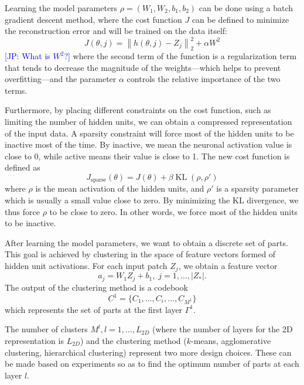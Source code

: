 \documentclass[runningheads]{llncs}
\newcommand{\commentJP}[1]{\textcolor{blue}{[JP: #1]}}
\newcommand{\KL}{\mathop{\textrm{KL}}}
\begin{document}
Learning the model parameters $\rho=(W_1,W_2,b_1,b_2)$ can be done using a batch gradient descent method, where the cost function $J$ can be defined to minimize the reconstruction error and will be trained on the data itself:
\begin{equation}
   J(\theta,j)=\left\|h(\theta,j)-Z_j\right\|_2^2 + \alpha W^2
\end{equation}
\commentJP{What is $W^2$?}
where the second term of the function is a regularization term that tends to decrease the magnitude of the weights---which helps to prevent overfitting---and the parameter $\alpha$ controls the relative importance of the two terms.
 
Furthermore, by placing different constraints on the cost function, such as limiting the number of hidden units, we can obtain a compressed representation of the input data. A sparsity constraint will force most of the hidden units to be inactive most of the time. By inactive, we mean the neuronal activation value is close to 0, while active means their value is close to 1. The new cost function is defined as
\begin{equation}
J_{\textrm{sparse}}(\theta)=J(\theta)+\beta \KL(\rho,\rho')
\end{equation}
where $\rho$ is the mean activation of the hidden units, and $\rho'$ is a sparsity parameter which is usually a small value close to zero. By minimizing the KL divergence, we thus force $\rho$ to be close to zero. In other words, we force most of the hidden units to be inactive.

After learning the model parameters, we want to obtain a discrete set of parts. This goal is achieved by clustering in the space of feature vectors formed of hidden unit activations. For each input patch $Z_j$, we obtain a feature vector
\begin{equation}
a_j=W_1Z_j+b_1, \;j=1,\ldots,|Z_*|.
\end{equation}
The output of the clustering method is a codebook
\begin{equation}
C^1=\{C_1,\ldots,C_i,\ldots,C_{M^1}\}
\end{equation}
which represents the set of parts at the first layer $\Gamma^{1}$. 

The number of clusters $M^l, l=1,\ldots,L_{2D}$ (where the number of layers for the 2D representation is $L_{2D}$) and the clustering method ($k$-means, agglomerative clustering, hierarchical clustering) represent two more design choices. These can be made based on experiments so as to find the optimum number of parts at each layer $l$. 
\end{document}
